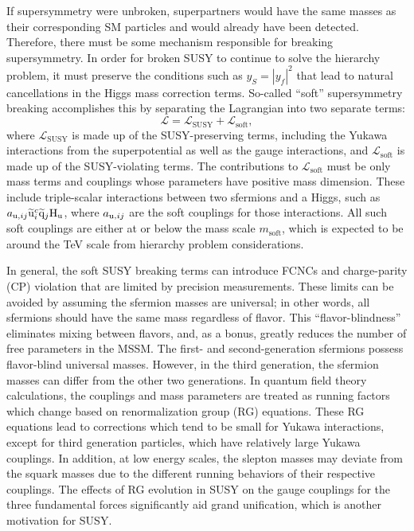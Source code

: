 If supersymmetry were unbroken, superpartners would have the same masses as their corresponding SM particles and would already have been detected. Therefore, there must be some mechanism responsible for breaking supersymmetry. In order for broken SUSY to continue to solve the hierarchy problem, it must preserve the conditions such as $y_{S} = |y_{f}|^2$ that lead to natural cancellations in the Higgs mass correction terms. So-called ``soft'' supersymmetry breaking accomplishes this by separating the Lagrangian into two separate terms:
\begin{equation}
\mathcal{L} = \mathcal{L}_{\text{SUSY}} + \mathcal{L}_{\text{soft}},
\end{equation}
where $\mathcal{L}_{\text{SUSY}}$ is made up of the SUSY-preserving terms, including the Yukawa interactions from the superpotential as well as the gauge interactions, and $\mathcal{L}_{\text{soft}}$ is made up of the SUSY-violating terms. The contributions to $\mathcal{L}_{\text{soft}}$ must be only mass terms and couplings whose parameters have positive mass dimension. These include triple-scalar interactions between two sfermions and a Higgs, such as $a_{\mathrm{u},ij} \widetilde{\mathrm{u}}_{i}^{c} \widetilde{\mathrm{q}}_{j} \mathrm{H}_\mathrm{u}$, where $a_{\mathrm{u},ij}$ are the soft couplings for those interactions. All such soft couplings are either at or below the mass scale $m_{\text{soft}}$, which is expected to be around the TeV scale from hierarchy problem considerations.

In general, the soft SUSY breaking terms can introduce FCNCs and charge-parity (CP) violation that are limited by precision measurements. These limits can be avoided by assuming the sfermion masses are universal; in other words, all sfermions should have the same mass regardless of flavor. This ``flavor-blindness'' eliminates mixing between flavors, and, as a bonus, greatly reduces the number of free parameters in the MSSM. The first- and second-generation sfermions possess flavor-blind universal masses. However, in the third generation, the sfermion masses can differ from the other two generations. In quantum field theory calculations, the couplings and mass parameters are treated as running factors which change based on renormalization group (RG) equations. These RG equations lead to corrections which tend to be small for Yukawa interactions, except for third generation particles, which have relatively large Yukawa couplings. In addition, at low energy scales, the slepton masses may deviate from the squark masses due to the different running behaviors of their respective couplings. The effects of RG evolution in SUSY on the gauge couplings for the three fundamental forces significantly aid grand unification, which is another motivation for SUSY.


